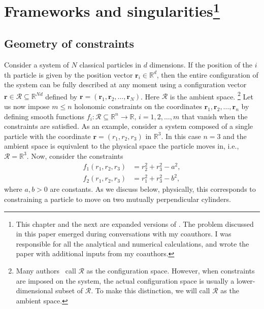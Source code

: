 
\chapter[Frameworks and singularities]{Frameworks and singularities\footnote{%
  This chapter and the next are expanded versions of .
  The problem discussed in this paper emerged during conversations with my coauthors.
  I was responsible for all the analytical and numerical calculations, and wrote the paper with additional inputs from my coauthors.}}


\section{Geometry of constraints}
\label{sec:constraints}

Consider a system of $N$ classical particles in $d$ dimensions.  If the position of the $i$th particle is given by the position vector $\bm{r}_{i} \in \mathbb{R}^{d}$, then the entire configuration of the system can be fully described at any moment using a configuration vector $\bm{r} \in \mathscr{R} \subseteq \mathbb{R}^{Nd}$ defined by $\bm{r} = (\bm{r}_{1}, \bm{r}_{2}, \ldots, \bm{r}_{N})$.
  Here $\mathscr{R}$ is the ambient space.%
  \footnote{Many authors~\cite{littlejohn1997,lelievre2010} call $\mathscr{R}$ as the configuration space.  However, when constraints are imposed on the system, the actual configuration space is usually a lower-dimensional subset of $\mathscr{R}$.  To make this distinction, we will call $\mathscr{R}$ as the ambient space.}
Let us now impose $m \leq n$ holonomic constraints on the coordinates $\bm{r}_1, \bm{r}_2, \dots, \bm{r}_n$ by defining smooth functions $f_i: \mathscr{R} \subseteq \mathbb{R}^n \to \mathbb{R},\, i=1, 2, \dots, m$ that vanish when the constraints are satisfied.
As an example, consider a system composed of a single particle with the coordinate $\bm{r} = (r_{1}, r_{2}, r_{3})$ in $\mathbb{R}^3$.
In this case $n=3$ and the ambient space is equivalent to the physical space the particle moves in, i.e., $\mathscr{R} = \mathbb{R}^3$.
Now, consider the constraints
%
\begin{equation}
  \begin{aligned}
    f_1(r_{1}, r_{2}, r_{3}) &= r_{2}^{2} + r_{3}^{2} - a^{2},\\
    f_2(r_{1}, r_{2}, r_{3}) &= r_{1}^{2} + r_{3}^{2} - b^{2},
  \end{aligned}
  \label{eq:cylcyl}
\end{equation}
%
where $a, b > 0$ are constants.
As we discuss below, physically, this corresponds to constraining a particle to move on two mutually perpendicular cylinders.

